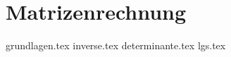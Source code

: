 \section{Matrizenrechnung}
    {grundlagen.tex}
    \raggedcolumns
    {inverse.tex}
    \raggedcolumns
    {determinante.tex}
    \raggedcolumns
    {lgs.tex}
    \raggedcolumns